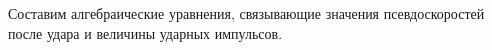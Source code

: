 
%

Составим алгебраические уравнения, связывающие значения псевдоскоростей после удара и величины ударных импульсов.

